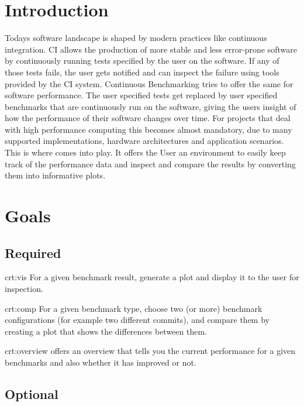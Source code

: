 \section{Introduction}

Todays software landscape is shaped by modern practices like continuous integration. CI allows the production of more stable and less error-prone software by continuously running tests specified by the user on the software. If any of those tests fails, the user gets notified and can inspect the failure using tools provided by the CI system. Continuous Benchmarking tries to offer the same for software performance. The user specified tests get replaced by user specified benchmarks that are continuously run on the software, giving the users insight of how the performance of their software changes over time. For projects that deal with high performance computing this becomes almost mandatory, due to many supported implementations, hardware architectures and application scenarios. This is where \parkview{} comes into play. It offers the User an environment to easily keep track of the performance data and inspect and compare the results by converting them into informative plots.

\section{Goals}

\subsection{Required}

{crt:vis}
{For a given \gls{benchmark result}, generate a \gls{plot} and display it to the user for inspection.}

{crt:comp}
{For a given \gls{benchmark type}, choose two (or more) \glspl{benchmark configuration} (for example two different commits), and compare them by creating a \gls{plot} that shows the differences between them.}

{crt:overview}
{\parkview{} offers an overview that tells you the current performance for a given benchmarks and also whether it has improved or not.}

\subsection{Optional}

